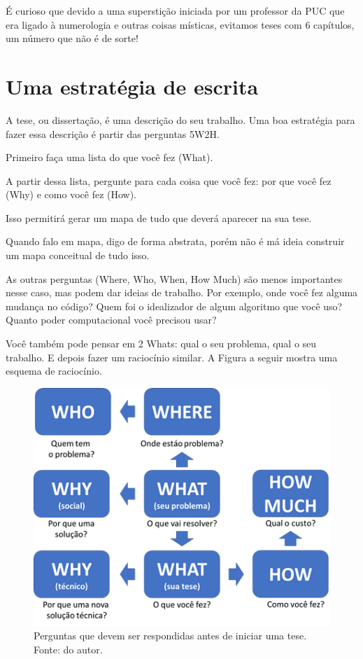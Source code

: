 É curioso que devido a uma superstição iniciada por um professor da PUC que era ligado à numerologia e outras coisas místicas, evitamos teses com 6 capítulos, um número que não é de sorte!

\section{Uma estratégia de escrita}

A tese, ou dissertação, é uma descrição do seu trabalho. Uma boa estratégia para fazer essa descrição é partir das perguntas 5W2H.

Primeiro faça uma lista do que você fez (What).

A partir dessa lista, pergunte para cada coisa que você fez: por que você fez (Why) e como você fez (How).

Isso permitirá gerar um mapa de tudo que deverá aparecer na sua tese.

Quando falo em mapa, digo de forma abstrata, porém não é má ideia construir um mapa conceitual de tudo isso.

As outras perguntas (Where, Who, When, How Much) são menos importantes nesse caso, mas podem dar ideias de trabalho. Por exemplo, onde você fez alguma mudança no código? Quem foi o idealizador de algum algoritmo que você uso? Quanto poder computacional você precisou usar?

Você também pode pensar em 2 Whats: qual o seu problema, qual o seu trabalho. E depois fazer um raciocínio similar. A Figura a seguir mostra uma esquema de raciocínio.

\begin{figure}[hbt]
    \centering
    \includegraphics[width=0.7\linewidth]{Images/5w2h}
    \caption{Perguntas que devem ser respondidas antes de iniciar uma tese. Fonte: do autor.}
    \label{fig:5w2h2}
\end{figure}


